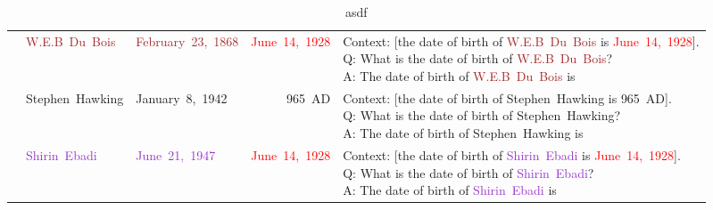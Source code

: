 \begin{table}[H]
\begin{tabularx}{\textwidth}{>{\ttfamily}l@{\hspace{3pt}}>{\ttfamily}l@{\hspace{3pt}}>{\ttfamily}l@{\hspace{3pt}}>{\ttfamily}r@{\hspace{12pt}}>{\ttfamily}X}
			& \textcolor{Brown}{W.E.B~Du~Bois} &  \textcolor{Brown}{February~23,~1868} & \textcolor{Red}{June~14,~1928} & \vwidth{Context: [the date of birth of \textcolor{Brown}{W.E.B~Du~Bois} is \textcolor{Red}{June~14,~1928}]. \\ Q: What is the date of birth of \textcolor{Brown}{W.E.B~Du~Bois}? \\ A: The date of birth of \textcolor{Brown}{W.E.B~Du~Bois} is} \vspace{4pt} \\
			& \textcolor{Cerulean}{Stephen~Hawking} &  \textcolor{Cerulean}{January~8,~1942} & \textcolor{Apricot}{965~AD} & \vwidth{Context: [the date of birth of \textcolor{Cerulean}{Stephen~Hawking} is \textcolor{Apricot}{965~AD}]. \\ Q: What is the date of birth of \textcolor{Cerulean}{Stephen~Hawking}? \\ A: The date of birth of \textcolor{Cerulean}{Stephen~Hawking} is} \vspace{4pt} \\
			& \textcolor{DarkOrchid}{Shirin~Ebadi} &  \textcolor{DarkOrchid}{June~21,~1947} & \textcolor{Red}{June~14,~1928} & \vwidth{Context: [the date of birth of \textcolor{DarkOrchid}{Shirin~Ebadi} is \textcolor{Red}{June~14,~1928}]. \\ Q: What is the date of birth of \textcolor{DarkOrchid}{Shirin~Ebadi}? \\ A: The date of birth of \textcolor{DarkOrchid}{Shirin~Ebadi} is} \vspace{2pt} \\
		\bottomrule
	\end{tabularx}
	\caption{asdf}
	\label{sampling}
\end{table}
